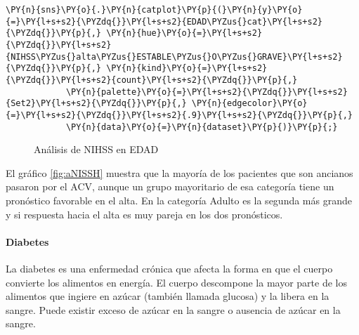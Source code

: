     \begin{tcolorbox}[breakable, size=fbox, boxrule=1pt, pad at break*=1mm,colback=cellbackground, colframe=cellborder]
\begin{Verbatim}[commandchars=\\\{\}]
\PY{n}{sns}\PY{o}{.}\PY{n}{catplot}\PY{p}{(}\PY{n}{y}\PY{o}{=}\PY{l+s+s2}{\PYZdq{}}\PY{l+s+s2}{EDAD\PYZus{}cat}\PY{l+s+s2}{\PYZdq{}}\PY{p}{,} \PY{n}{hue}\PY{o}{=}\PY{l+s+s2}{\PYZdq{}}\PY{l+s+s2}{NIHSS\PYZus{}alta\PYZus{}ESTABLE\PYZus{}O\PYZus{}GRAVE}\PY{l+s+s2}{\PYZdq{}}\PY{p}{,} \PY{n}{kind}\PY{o}{=}\PY{l+s+s2}{\PYZdq{}}\PY{l+s+s2}{count}\PY{l+s+s2}{\PYZdq{}}\PY{p}{,}
            \PY{n}{palette}\PY{o}{=}\PY{l+s+s2}{\PYZdq{}}\PY{l+s+s2}{Set2}\PY{l+s+s2}{\PYZdq{}}\PY{p}{,} \PY{n}{edgecolor}\PY{o}{=}\PY{l+s+s2}{\PYZdq{}}\PY{l+s+s2}{.9}\PY{l+s+s2}{\PYZdq{}}\PY{p}{,}
            \PY{n}{data}\PY{o}{=}\PY{n}{dataset}\PY{p}{)}\PY{p}{;}
\end{Verbatim}
\end{tcolorbox}

\begin{center}
    	\begin{figure}[H]
	\centering
	\caption{Análisis de NIHSS en EDAD}
	\label{fig:aNISSh}
	\end{figure}
\end{center}
    
    El gráfico \ref{fig:aNISSH} muestra que la mayoría de los pacientes que son ancianos
pasaron por el ACV, aunque un grupo mayoritario de esa categoría tiene
un pronóstico favorable en el alta. En la categoría Adulto es la segunda
más grande y si respuesta hacia el alta es muy pareja en los dos
pronósticos.

    \hypertarget{diabetes}{%
\paragraph{Diabetes}\label{diabetes}}

La diabetes es una enfermedad crónica que afecta la forma en que el
cuerpo convierte los alimentos en energía. El cuerpo descompone la mayor
parte de los alimentos que ingiere en azúcar (también llamada glucosa) y
la libera en la sangre. Puede existir exceso de azúcar en la sangre o
ausencia de azúcar en la sangre.

